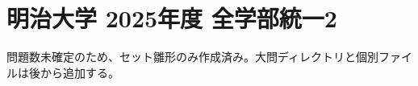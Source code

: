 \documentclass[../../uem_mei_q.tex]{subfiles}
\begin{document}
    \section{明治大学 2025年度 全学部統一2}

    問題数未確定のため、セット雛形のみ作成済み。大問ディレクトリと個別ファイルは後から追加する。
\end{document}
